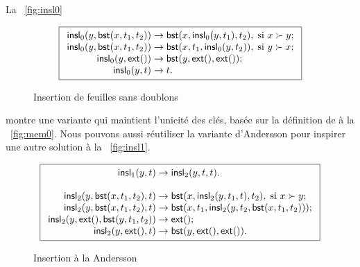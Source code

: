 La \fig~\vref{fig:insl0}
\begin{figure}
\begin{equation*}
\boxed{
\begin{array}{r@{\;}l@{\;}l}
\fun{insl}_0(y,\fun{bst}(x,t_1,t_2)) & \rightarrow &
  \fun{bst}(x,\fun{insl}_0(y,t_1),t_2), \; \text{si \(x \succ y\)};\\
\fun{insl}_0(y,\fun{bst}(x,t_1,t_2)) & \rightarrow &
  \fun{bst}(x,t_1,\fun{insl}_0(y,t_2)) , \; \text{si \(y \succ x\)};\\
\fun{insl}_0(y,\fun{ext}()) & \rightarrow &
\fun{bst}(y,\fun{ext}(),\fun{ext}());\\
\fun{insl}_0(y,t) & \rightarrow & t.
\end{array}}
\end{equation*}
\caption{Insertion de feuilles sans doublons}
\label{fig:insl0}
\end{figure}
montre une variante qui maintient l'unicité des clés, basée sur la
définition de  à la
\fig~\vref{fig:mem0}. Nous pouvons aussi réutiliser la variante
d'Andersson pour inspirer une autre solution à la
\fig~\vref{fig:insl1}.
\begin{figure}[b]
\begin{equation*}
\boxed{
\begin{array}{r@{\;}l@{\;}l}
\fun{insl}_1(y,t) & \rightarrow & \fun{insl}_2(y,t,t).\\
\\
\fun{insl}_2(y,\fun{bst}(x,t_1,t_2),t) & \rightarrow &
  \fun{bst}(x,\fun{insl}_2(y,t_1,t),t_2), \; \text{si \(x \succ y\)};\\
\fun{insl}_2(y,\fun{bst}(x,t_1,t_2),t) & \rightarrow &
  \fun{bst}(x,t_1,\fun{insl}_2(y,t_2,\fun{bst}(x,t_1,t_2)));\\
\fun{insl}_2(y,\fun{ext}(),\fun{bst}(y,t_1,t_2)) & \rightarrow & \fun{ext}();\\
\fun{insl}_2(y,\fun{ext}(),t) & \rightarrow & \fun{bst}(y,\fun{ext}(),\fun{ext}()).
\end{array}}
\end{equation*}
\caption{Insertion à la Andersson}
\label{fig:insl1}
\end{figure}


